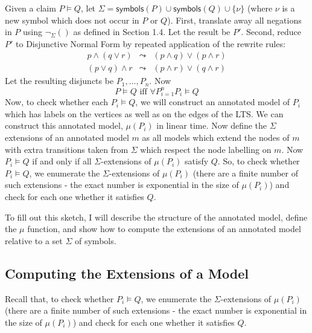 Given a claim $P \models Q$, let $\Sigma = \mathsf{symbols}(P) \cup \mathsf{symbols}(Q) \cup \{\nu\}$ (where $\nu$ is a new symbol which does not occur in $P$ or $Q$).
First, translate away all negations in $P$ using $\neg_\Sigma()$ as defined in Section 1.4.
Let the result be $P'$.
Second, reduce $P'$ to Disjunctive Normal Form by repeated application of the rewrite rules:
\begin{eqnarray}
p \land (q \lor r) & \leadsto & (p \land q) \lor (p \land r) \nonumber \\
(p \lor q) \land r & \leadsto & (p \land r) \lor (q \land r) \nonumber
\end{eqnarray}
Let the resulting disjuncts be $P_1, ..., P_n$. 
Now 
\[
P \models Q \mbox{ iff } \forall P_{i=1}^n P_i \models Q
\]
Now, to check whether each $P_i \models Q$, we will construct an annotated model of $P_i$ which has labels on the vertices as well as on the edges of the LTS. We can construct this annotated model, $\mu(P_i)$ in linear time. 
Now define the $\Sigma$ extensions of an annotated model $m$ as all models which extend the nodes of $m$ with extra transitions taken from $\Sigma$ which respect the node labelling on $m$.
Now $P_i \models Q$ if and only if all $\Sigma$-extensions of $\mu(P_i)$ satisfy $Q$.
So, to check whether $P_i \models Q$, we enumerate the $\Sigma$-extensions of $\mu(P_i)$ (there are a finite number of such extensions - the exact number is exponential in the size of $\mu(P_i)$) and check for each one whether it satisfies $Q$.

To fill out this sketch, I will describe the structure of the annotated model, define the $\mu$ function, and show how to compute the extensions of an annotated model relative to a set $\Sigma$ of symbols.


\subsection{Computing the Extensions of a Model}

Recall that, to check whether $P_i \models Q$, we enumerate the $\Sigma$-extensions of $\mu(P_i)$ (there are a finite number of such extensions - the exact number is exponential in the size of $\mu(P_i)$) and check for each one whether it satisfies $Q$.

